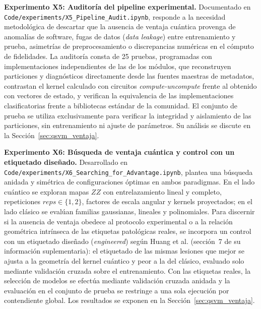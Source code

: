 \textbf{Experimento X5: Auditoría del pipeline experimental.} Documentado en
\texttt{Code/}\allowbreak\texttt{experiments/}\allowbreak\texttt{X5\_Pipeline\_Audit.ipynb}, responde a la necesidad metodológica de
descartar que la ausencia de ventaja cuántica provenga de anomalías de software, fugas de datos (\textit{data leakage}) entre entrenamiento
y prueba, asimetrías de preprocesamiento o discrepancias numéricas en el cómputo de fidelidades. La auditoría consta de 25 pruebas,
programadas con implementaciones independientes de las de los módulos, que reconstruyen particiones y diagnósticos directamente desde las fuentes maestras de metadatos,
contrastan el kernel calculado con circuitos \textit{compute-uncompute} frente al obtenido con vectores de estado, y verifican la
equivalencia de las implementaciones clasificatorias frente a bibliotecas estándar de la comunidad. El conjunto de prueba se
utiliza exclusivamente para verificar la integridad y aislamiento de las particiones, sin entrenamiento ni ajuste de parámetros.
Su análisis se discute en la Sección~\ref{sec:qsvm_ventaja}.

\textbf{Experimento X6: Búsqueda de ventaja cuántica y control con un etiquetado diseñado.} Desarrollado en
\texttt{Code/}\allowbreak\texttt{experiments/}\allowbreak\texttt{X6\_Searching\_for\_Advantage.ipynb}, plantea una búsqueda anidada y
simétrica de configuraciones óptimas en ambos paradigmas. En el lado cuántico se exploran mapas $ZZ$ con entrelazamiento lineal y
completo, repeticiones $reps \in \{1, 2\}$, factores de escala angular y kernels proyectados; en el lado clásico se evalúan familias
gaussianas, lineales y polinomiales. Para discernir si la ausencia de ventaja obedece al protocolo experimental o a la relación
geométrica intrínseca de las etiquetas patológicas reales, se incorpora un control con un etiquetado diseñado (\textit{engineered}) según Huang et al. \cite{huang2021power}
(sección~7 de su información suplementaria): el etiquetado de las mismas lesiones que mejor se ajusta a la geometría del kernel
cuántico y peor a la del clásico, evaluado solo mediante validación cruzada sobre el entrenamiento. Con las etiquetas reales, la selección
de modelos se efectúa mediante validación cruzada anidada y la evaluación en el conjunto de prueba se restringe a una sola ejecución por
contendiente global.
Los resultados se exponen en la Sección~\ref{sec:qsvm_ventaja}.

